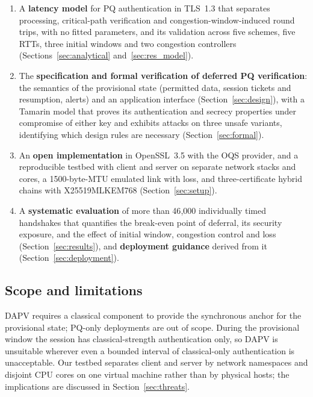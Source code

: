 \documentclass[preprint,10pt,3p]{elsarticle}
\begin{document}
\begin{enumerate}[label=(\arabic*), leftmargin=*]
\item A \textbf{latency model} for PQ authentication in TLS~1.3 that
  separates processing, critical-path verification and
  congestion-window-induced round trips, with no fitted parameters, and its
  validation across five schemes, five RTTs, three initial windows and two
  congestion controllers (Sections~\ref{sec:analytical}
  and~\ref{sec:res_model}).
\item The \textbf{specification and formal verification of deferred PQ
  verification}: the semantics of the provisional state (permitted data,
  session tickets and resumption, alerts) and an application interface
  (Section~\ref{sec:design}), with a Tamarin model that proves its
  authentication and secrecy properties under compromise of either key and
  exhibits attacks on three unsafe variants, identifying which design
  rules are necessary (Section~\ref{sec:formal}).
\item An \textbf{open implementation} in OpenSSL~3.5 with the OQS provider,
  and a reproducible testbed with client and server on separate network
  stacks and cores, a 1500-byte-MTU emulated link with loss, and
  three-certificate hybrid chains with X25519MLKEM768
  (Section~\ref{sec:setup}).
\item A \textbf{systematic evaluation} of more than
  46{,}000 individually timed handshakes that quantifies the break-even point of
  deferral, its security exposure, and the effect of initial window,
  congestion control and loss (Section~\ref{sec:results}), and
  \textbf{deployment guidance} derived from it
  (Section~\ref{sec:deployment}).
\end{enumerate}

\subsection{Scope and limitations}

DAPV requires a classical component to provide the synchronous anchor for
the provisional state; PQ-only deployments are out of scope.  During the
provisional window the session has classical-strength authentication only,
so DAPV is unsuitable wherever even a bounded interval of classical-only
authentication is unacceptable.  Our testbed separates client and server by
network namespaces and disjoint CPU cores on one virtual machine rather than
by physical hosts; the implications are discussed in
Section~\ref{sec:threats}.
\end{document}
